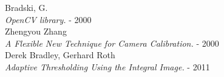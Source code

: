 \documentclass[journal]{IEEEtran}
\begin{document}

\begin{thebibliography}{1}

  Bradski, G. \\
  \textit{OpenCV library.} - 2000
\\
  Zhengyou Zhang \\
  \textit{A Flexible New Technique for Camera Calibration.} - 2000
\\
  Derek Bradley, Gerhard Roth \\
  \textit{Adaptive Thresholding Using the Integral Image.} - 2011


\end{thebibliography}
\end{document}
